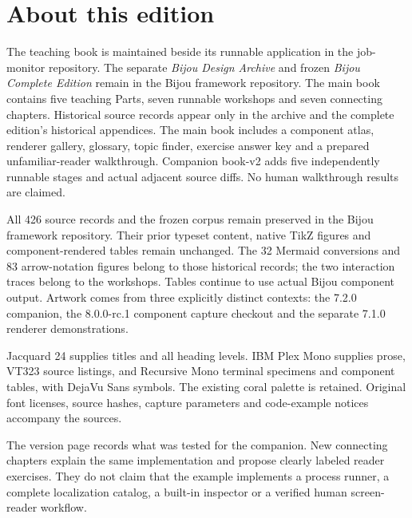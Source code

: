 \chapter*{About this edition}

The teaching book is maintained beside its runnable application in the job-monitor repository. The separate \textit{Bijou Design Archive} and frozen \textit{Bijou Complete Edition} remain in the Bijou framework repository. The main book contains five teaching Parts, seven runnable workshops and seven connecting chapters. Historical source records appear only in the archive and the complete edition's historical appendices. The main book includes a component atlas, renderer gallery, glossary, topic finder, exercise answer key and a prepared unfamiliar-reader walkthrough. Companion book-v2 adds five independently runnable stages and actual adjacent source diffs. No human walkthrough results are claimed.

All 426 source records and the frozen corpus remain preserved in the Bijou framework repository. Their prior typeset content, native TikZ figures and component-rendered tables remain unchanged. The 32 Mermaid conversions and 83 arrow-notation figures belong to those historical records; the two interaction traces belong to the workshops. Tables continue to use actual Bijou component output. Artwork comes from three explicitly distinct contexts: the 7.2.0 companion, the 8.0.0-rc.1 component capture checkout and the separate 7.1.0 renderer demonstrations.

Jacquard 24 supplies titles and all heading levels. IBM Plex Mono supplies prose, VT323 source listings, and Recursive Mono terminal specimens and component tables, with DejaVu Sans symbols. The existing coral palette is retained. Original font licenses, source hashes, capture parameters and code-example notices accompany the sources.

The version page records what was tested for the companion. New connecting chapters explain the same implementation and propose clearly labeled reader exercises. They do not claim that the example implements a process runner, a complete localization catalog, a built-in inspector or a verified human screen-reader workflow.
